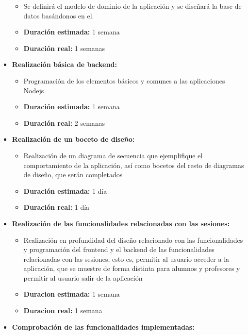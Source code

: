 \documentclass[openright,twoside,10pt]{book}
\providecommand{\tightlist}{%
  \setlength{\itemsep}{0pt}\setlength{\parskip}{0pt}}
\begin{document}
\begin{itemize}
      \begin{itemize}
      \tightlist
      \item
        Se definirá el modelo de dominio de la aplicación y se diseñará la
        base de datos basándonos en el.
      \item
        \textbf{Duración estimada:} 1 semana
      \item
        \textbf{Duración real:} 1 semanas
      \end{itemize}
    \item
      \textbf{Realización básica de backend:}
    
      \begin{itemize}
      \tightlist
      \item
        Programación de los elementos básicos y comunes a las aplicaciones
        Nodejs
      \item
        \textbf{Duración estimada:} 1 semana
      \item
        \textbf{Duración real:} 2 semanas
      \end{itemize}
    \item
      \textbf{Realización de un boceto de diseño:}
    
      \begin{itemize}
      \tightlist
      \item
        Realización de un diagrama de secuencia que ejemplifique el
        comportamiento de la aplicación, así como bocetos del resto de
        diagramas de diseño, que serán completados
      \item
        \textbf{Duración estimada:} 1 día
      \item
        \textbf{Duración real:} 1 día
      \end{itemize}
    \item
      \textbf{Realización de las funcionalidades relacionadas con las
      sesiones:}
    
      \begin{itemize}
      \tightlist
      \item
        Realización en profundidad del diseño relacionado con las
        funcionalidades y programación del frontend y el backend de las
        funcionalidades relacionadas con las sesiones, esto es, permitir al
        usuario acceder a la aplicación, que se muestre de forma distinta
        para alumnos y profesores y permitir al usuario salir de la
        aplicación
      \item
        \textbf{Duracion estimada:} 1 semana
      \item
        \textbf{Duracion real:} 1 semana
      \end{itemize}
    \item
      \textbf{Comprobación de las funcionalidades implementadas:}
    

\end{itemize}
\end{document}
